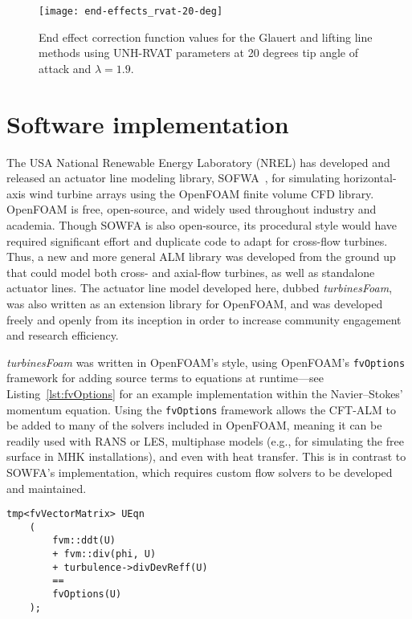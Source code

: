 \begin{figure}
    \centering
    
    \texttt{[image: end-effects\_rvat-20-deg]}
    
    \caption{End effect correction function values for the Glauert and lifting
        line methods using UNH-RVAT parameters at 20 degrees tip angle of attack and
        $\lambda=1.9$.}
    
    \label{fig:end-effects}
\end{figure}


\section{Software implementation}

The USA National Renewable Energy Laboratory (NREL) has developed and released
an actuator line modeling library, SOFWA~\cite{Churchfield2014b}, for simulating
horizontal-axis wind turbine arrays using the OpenFOAM finite volume CFD
library. OpenFOAM is free, open-source, and widely used throughout industry and
academia. Though SOWFA is also open-source, its procedural style would have
required significant effort and duplicate code to adapt for cross-flow turbines.
Thus, a new and more general ALM library was developed from the ground up that
could model both cross- and axial-flow turbines, as well as standalone actuator
lines. The actuator line model developed here, dubbed \textit{turbinesFoam}, was
also written as an extension library for OpenFOAM, and was developed freely and
openly from its inception in order to increase community engagement and research
efficiency. 

\textit{turbinesFoam} was written in OpenFOAM's style, using OpenFOAM's
\texttt{fvOptions} framework for adding source terms to equations at
runtime---see Listing~\ref{lst:fvOptions} for an example implementation within
the Navier--Stokes' momentum equation. Using the \texttt{fvOptions} framework
allows the CFT-ALM to be added to many of the solvers included in OpenFOAM,
meaning it can be readily used with RANS or LES, multiphase models (e.g., for
simulating the free surface in MHK installations), and even with heat transfer.
This is in contrast to SOWFA's implementation, which requires custom flow
solvers to be developed and maintained.

\begin{lstlisting}[float,caption=Adding source terms to the momentum equation in OpenFOAM.,label=lst:fvOptions]
    tmp<fvVectorMatrix> UEqn
    (
        fvm::ddt(U)
        + fvm::div(phi, U)
        + turbulence->divDevReff(U)
        ==
        fvOptions(U)
    );
\end{lstlisting}

